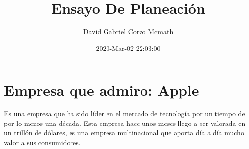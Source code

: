 \documentclass{article}
\title{Ensayo De Planeación}
\date{2020-Mar-02 22:03:00}
\author{David Gabriel Corzo Mcmath}
\begin{document}
\maketitle


\section{Empresa que admiro: Apple}
Es una empresa que ha sido líder en el mercado de tecnología por un tiempo de por lo menos una década. Esta empresa hace unos meses llego a ser valorada en un trillón de dólares, es una empresa multinacional que aporta día a día mucho valor a sus consumidores.

\end{document}
